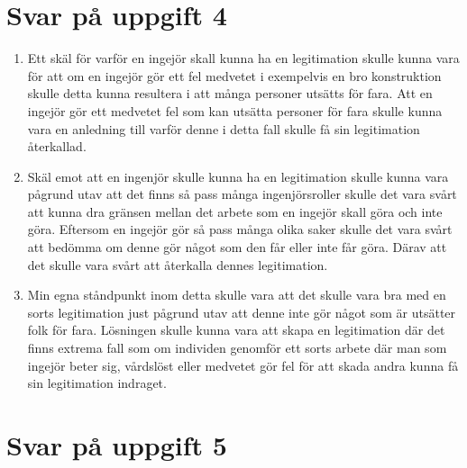 \documentclass[a4paper,12pt]{article}
\begin{document}



\section*{Svar på uppgift 4}


\begin{enumerate}
  \item Ett skäl för varför en ingejör skall kunna ha en legitimation 
  skulle kunna vara för att om en ingejör gör ett fel medvetet i exempelvis en bro 
  konstruktion skulle detta kunna resultera i att många personer utsätts för fara. Att en 
  ingejör gör ett medvetet fel som kan utsätta personer för fara skulle kunna vara
  en anledning till varför denne i detta fall skulle få sin legitimation återkallad. 
  \item Skäl emot att en ingenjör skulle kunna ha en legitimation
  skulle kunna vara pågrund utav att det finns så pass många ingenjörsroller skulle det
  vara svårt att kunna dra gränsen mellan det arbete som en ingejör skall göra och
  inte göra. Eftersom en ingejör gör så pass många olika saker skulle det vara svårt att bedömma
  om denne gör något som den får eller inte får göra. Därav att det skulle vara svårt att
  återkalla dennes legitimation. 
  \item Min egna ståndpunkt inom detta skulle vara att det skulle vara bra med
  en sorts legitimation just pågrund utav att denne inte gör något som är utsätter folk
  för fara. Lösningen skulle kunna vara att skapa en legitimation där det finns extrema 
  fall som om individen genomför ett sorts arbete där man som ingejör beter sig, vårdslöst
  eller medvetet gör fel för att skada andra kunna få sin legitimation indraget.
\end{enumerate}

\newpage
\section*{Svar på uppgift 5}
\end{document}
